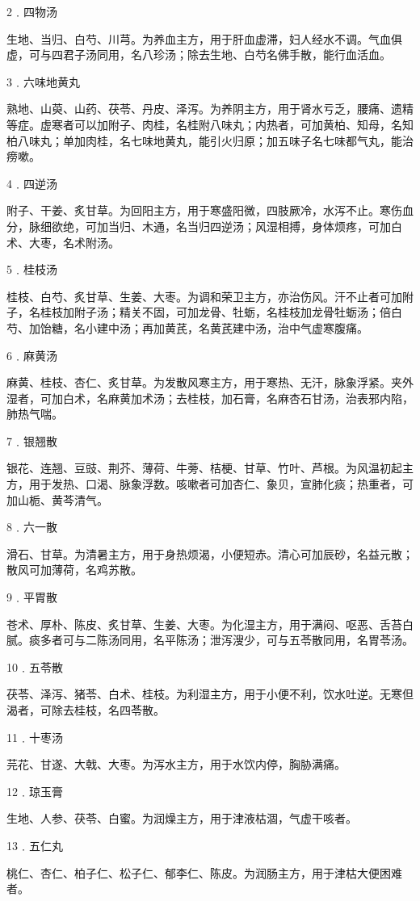 \documentclass[a4paper,12pt,UTF8,twoside]{ctexbook}
\begin{document}
2﹒四物汤

生地、当归、白芍、川芎。为养血主方，用于肝血虚滞，妇人经水不调。气血俱虚，可与四君子汤同用，名八珍汤；除去生地、白芍名佛手散，能行血活血。

3﹒六味地黄丸

熟地、山萸、山药、茯苓、丹皮、泽泻。为养阴主方，用于肾水亏乏，腰痛、遗精等症。虚寒者可以加附子、肉桂，名桂附八味丸；内热者，可加黄柏、知母，名知柏八味丸；单加肉桂，名七味地黄丸，能引火归原；加五味子名七味都气丸，能治痨嗽。

4﹒四逆汤

附子、干姜、炙甘草。为回阳主方，用于寒盛阳微，四肢厥冷，水泻不止。寒伤血分，脉细欲绝，可加当归、木通，名当归四逆汤；风湿相搏，身体烦疼，可加白术、大枣，名术附汤。

5﹒桂枝汤

桂枝、白芍、炙甘草、生姜、大枣。为调和荣卫主方，亦治伤风。汗不止者可加附子，名桂枝加附子汤；精关不固，可加龙骨、牡蛎，名桂枝加龙骨牡蛎汤；倍白芍、加饴糖，名小建中汤；再加黄芪，名黄芪建中汤，治中气虚寒腹痛。

6﹒麻黄汤

麻黄、桂枝、杏仁、炙甘草。为发散风寒主方，用于寒热、无汗，脉象浮紧。夹外湿者，可加白术，名麻黄加术汤；去桂枝，加石膏，名麻杏石甘汤，治表邪内陷，肺热气喘。

7﹒银翘散

银花、连翘、豆豉、荆芥、薄荷、牛蒡、桔梗、甘草、竹叶、芦根。为风温初起主方，用于发热、口渴、脉象浮数。咳嗽者可加杏仁、象贝，宣肺化痰；热重者，可加山栀、黄芩清气。

8﹒六一散

滑石、甘草。为清暑主方，用于身热烦渴，小便短赤。清心可加辰砂，名益元散；散风可加薄荷，名鸡苏散。

9﹒平胃散

苍术、厚朴、陈皮、炙甘草、生姜、大枣。为化湿主方，用于满闷、呕恶、舌苔白腻。痰多者可与二陈汤同用，名平陈汤；泄泻溲少，可与五苓散同用，名胃苓汤。

10﹒五苓散

茯苓、泽泻、猪苓、白术、桂枝。为利湿主方，用于小便不利，饮水吐逆。无寒但渴者，可除去桂枝，名四苓散。

11﹒十枣汤

芫花、甘遂、大戟、大枣。为泻水主方，用于水饮内停，胸胁满痛。

12﹒琼玉膏

生地、人参、茯苓、白蜜。为润燥主方，用于津液枯涸，气虚干咳者。

13﹒五仁丸

桃仁、杏仁、柏子仁、松子仁、郁李仁、陈皮。为润肠主方，用于津枯大便困难者。
\end{document}
